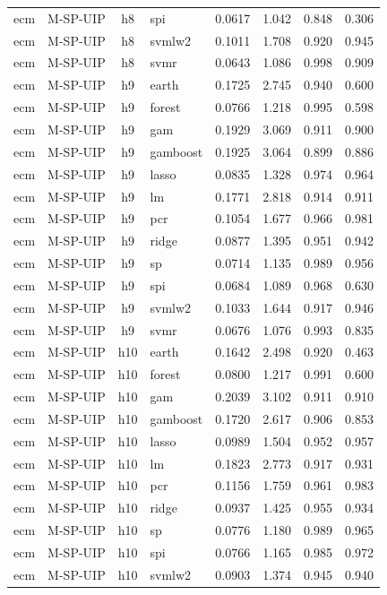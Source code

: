 \begin{ThreePartTable}
\begin{longtable}[t]{llclcccc}
ecm & M-SP-UIP & h8 & spi & 0.0617 & 1.042 & 0.848 & 0.306\\
ecm & M-SP-UIP & h8 & svmlw2 & 0.1011 & 1.708 & 0.920 & 0.945\\
ecm & M-SP-UIP & h8 & svmr & 0.0643 & 1.086 & 0.998 & 0.909\\
\addlinespace
ecm & M-SP-UIP & h9 & earth & 0.1725 & 2.745 & 0.940 & 0.600\\
ecm & M-SP-UIP & h9 & forest & 0.0766 & 1.218 & 0.995 & 0.598\\
ecm & M-SP-UIP & h9 & gam & 0.1929 & 3.069 & 0.911 & 0.900\\
ecm & M-SP-UIP & h9 & gamboost & 0.1925 & 3.064 & 0.899 & 0.886\\
ecm & M-SP-UIP & h9 & lasso & 0.0835 & 1.328 & 0.974 & 0.964\\
ecm & M-SP-UIP & h9 & lm & 0.1771 & 2.818 & 0.914 & 0.911\\
ecm & M-SP-UIP & h9 & pcr & 0.1054 & 1.677 & 0.966 & 0.981\\
ecm & M-SP-UIP & h9 & ridge & 0.0877 & 1.395 & 0.951 & 0.942\\
ecm & M-SP-UIP & h9 & sp & 0.0714 & 1.135 & 0.989 & 0.956\\
ecm & M-SP-UIP & h9 & spi & 0.0684 & 1.089 & 0.968 & 0.630\\
ecm & M-SP-UIP & h9 & svmlw2 & 0.1033 & 1.644 & 0.917 & 0.946\\
ecm & M-SP-UIP & h9 & svmr & 0.0676 & 1.076 & 0.993 & 0.835\\
\addlinespace
ecm & M-SP-UIP & h10 & earth & 0.1642 & 2.498 & 0.920 & 0.463\\
ecm & M-SP-UIP & h10 & forest & 0.0800 & 1.217 & 0.991 & 0.600\\
ecm & M-SP-UIP & h10 & gam & 0.2039 & 3.102 & 0.911 & 0.910\\
ecm & M-SP-UIP & h10 & gamboost & 0.1720 & 2.617 & 0.906 & 0.853\\
ecm & M-SP-UIP & h10 & lasso & 0.0989 & 1.504 & 0.952 & 0.957\\
ecm & M-SP-UIP & h10 & lm & 0.1823 & 2.773 & 0.917 & 0.931\\
ecm & M-SP-UIP & h10 & pcr & 0.1156 & 1.759 & 0.961 & 0.983\\
ecm & M-SP-UIP & h10 & ridge & 0.0937 & 1.425 & 0.955 & 0.934\\
ecm & M-SP-UIP & h10 & sp & 0.0776 & 1.180 & 0.989 & 0.965\\
ecm & M-SP-UIP & h10 & spi & 0.0766 & 1.165 & 0.985 & 0.972\\
ecm & M-SP-UIP & h10 & svmlw2 & 0.0903 & 1.374 & 0.945 & 0.940\\

\end{longtable}
\end{ThreePartTable}
